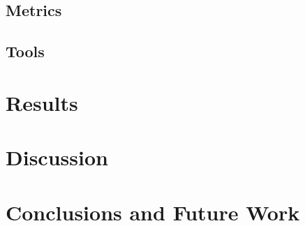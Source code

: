 \documentclass[10pt,conference]{IEEEtran}
\begin{document}
\subsection{Metrics}
\subsection{Tools}

\section{Results}

\section{Discussion}

\section{Conclusions and Future Work}



\end{document}
